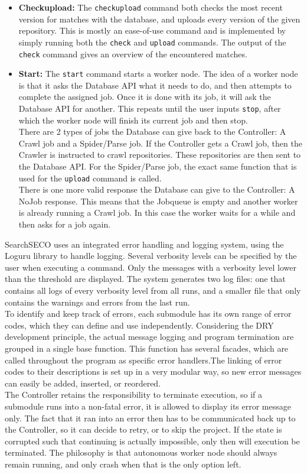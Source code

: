 \documentclass[../Main.tex]{subfiles}
\begin{document}
\begin{itemize}
\item \textbf{Checkupload:} The \texttt{checkupload} command both checks the most recent version for matches with the database, and uploads every version of the given repository. This is mostly an ease-of-use command and is implemented by simply running both the \texttt{check} and \texttt{upload} commands. The output of the \texttt{check} command gives an overview of the encountered matches.
\item \textbf{Start:} The \texttt{start} command starts a worker node. The idea of a worker node is that it asks the Database API what it needs to do, and then attempts to complete the assigned job. Once it is done with its job, it will ask the Database API for another. This repeats until the user inputs \texttt{stop}, after which the worker node will finish its current job and then stop.\\
There are 2 types of jobs the Database can give back to the Controller: A Crawl job and a Spider/Parse job. If the Controller gets a Crawl job, then the Crawler is instructed to crawl repositories. These repositories are then sent to the Database API. For the Spider/Parse job, the exact same function that is used for the \texttt{upload} command is called.\\
There is one more valid response the Database can give to the Controller: A NoJob response. This means that the Jobqueue is empty and another worker is already running a Crawl job. In this case the worker waits for a while and then asks for a job again.
\end{itemize}
SearchSECO uses an integrated error handling and logging system, using the Loguru \cite{loguru} library to handle logging. Several verbosity levels can be specified by the user when executing a command. Only the messages with a verbosity level lower than the threshold are displayed. The system generates two log files: one that contains all logs of every verbosity level from all runs, and a smaller file that only contains the warnings and errors from the last run. \\
To identify and keep track of errors, each submodule has its own range of error codes, which they can define and use independently. Considering the DRY development principle, the actual message logging and program termination are grouped in a single base function. This function has several facades, which are called throughout the program as specific error handlers.\newpage The linking of error codes to their descriptions is set up in a very modular way, so new error messages can easily be added, inserted, or reordered. \\
The Controller retains the responsibility to terminate execution, so if a submodule runs into a non-fatal error, it is allowed to display its error message only. The fact that it ran into an error then has to be communicated back up to the Controller, so it can decide to retry, or to skip the project. If the state is corrupted such that continuing is actually impossible, only then will execution be terminated. The philosophy is that autonomous worker node should always remain running, and only crash when that is the only option left.
\end{document}
